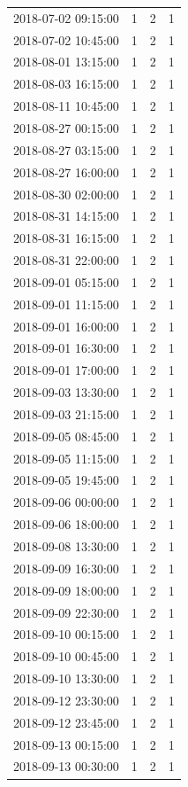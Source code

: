 \begin{tabular}{lrrr}
2018-07-02 09:15:00 & 1 & 2 & 1 \\
2018-07-02 10:45:00 & 1 & 2 & 1 \\
2018-08-01 13:15:00 & 1 & 2 & 1 \\
2018-08-03 16:15:00 & 1 & 2 & 1 \\
2018-08-11 10:45:00 & 1 & 2 & 1 \\
2018-08-27 00:15:00 & 1 & 2 & 1 \\
2018-08-27 03:15:00 & 1 & 2 & 1 \\
2018-08-27 16:00:00 & 1 & 2 & 1 \\
2018-08-30 02:00:00 & 1 & 2 & 1 \\
2018-08-31 14:15:00 & 1 & 2 & 1 \\
2018-08-31 16:15:00 & 1 & 2 & 1 \\
2018-08-31 22:00:00 & 1 & 2 & 1 \\
2018-09-01 05:15:00 & 1 & 2 & 1 \\
2018-09-01 11:15:00 & 1 & 2 & 1 \\
2018-09-01 16:00:00 & 1 & 2 & 1 \\
2018-09-01 16:30:00 & 1 & 2 & 1 \\
2018-09-01 17:00:00 & 1 & 2 & 1 \\
2018-09-03 13:30:00 & 1 & 2 & 1 \\
2018-09-03 21:15:00 & 1 & 2 & 1 \\
2018-09-05 08:45:00 & 1 & 2 & 1 \\
2018-09-05 11:15:00 & 1 & 2 & 1 \\
2018-09-05 19:45:00 & 1 & 2 & 1 \\
2018-09-06 00:00:00 & 1 & 2 & 1 \\
2018-09-06 18:00:00 & 1 & 2 & 1 \\
2018-09-08 13:30:00 & 1 & 2 & 1 \\
2018-09-09 16:30:00 & 1 & 2 & 1 \\
2018-09-09 18:00:00 & 1 & 2 & 1 \\
2018-09-09 22:30:00 & 1 & 2 & 1 \\
2018-09-10 00:15:00 & 1 & 2 & 1 \\
2018-09-10 00:45:00 & 1 & 2 & 1 \\
2018-09-10 13:30:00 & 1 & 2 & 1 \\
2018-09-12 23:30:00 & 1 & 2 & 1 \\
2018-09-12 23:45:00 & 1 & 2 & 1 \\
2018-09-13 00:15:00 & 1 & 2 & 1 \\
2018-09-13 00:30:00 & 1 & 2 & 1 \\

\end{tabular}
